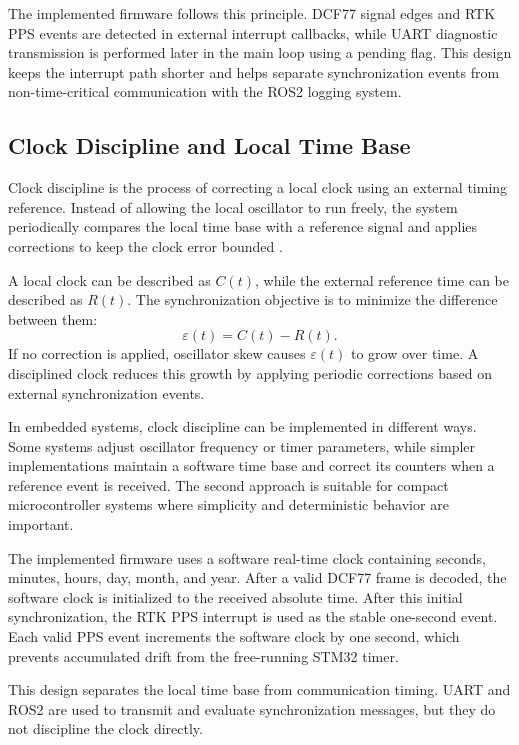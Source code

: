 The implemented firmware follows this principle. DCF77 signal edges and RTK PPS events are detected in external interrupt callbacks, while UART diagnostic transmission is performed later in the main loop using a pending flag. This design keeps the interrupt path shorter and helps separate synchronization events from non-time-critical communication with the ROS2 logging system.

\subsection{Clock Discipline and Local Time Base}

Clock discipline is the process of correcting a local clock using an external timing reference. Instead of allowing the local oscillator to run freely, the system periodically compares the local time base with a reference signal and applies corrections to keep the clock error bounded \cite{kopetz2011realtime}.

A local clock can be described as $C(t)$, while the external reference time can be described as $R(t)$. The synchronization objective is to minimize the difference between them:
\begin{equation}
\varepsilon(t) = C(t) - R(t).
\end{equation}
If no correction is applied, oscillator skew causes $\varepsilon(t)$ to grow over time. A disciplined clock reduces this growth by applying periodic corrections based on external synchronization events.

In embedded systems, clock discipline can be implemented in different ways. Some systems adjust oscillator frequency or timer parameters, while simpler implementations maintain a software time base and correct its counters when a reference event is received. The second approach is suitable for compact microcontroller systems where simplicity and deterministic behavior are important.

The implemented firmware uses a software real-time clock containing seconds, minutes, hours, day, month, and year. After a valid DCF77 frame is decoded, the software clock is initialized to the received absolute time. After this initial synchronization, the RTK PPS interrupt is used as the stable one-second event. Each valid PPS event increments the software clock by one second, which prevents accumulated drift from the free-running STM32 timer.

This design separates the local time base from communication timing. UART and ROS2 are used to transmit and evaluate synchronization messages, but they do not discipline the clock directly.

